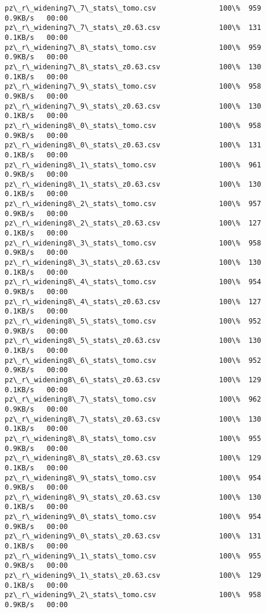 \documentclass[11pt]{article}
\begin{document}
\begin{Verbatim}[commandchars=\\\{\}]
pz\_r\_widening7\_7\_stats\_tomo.csv               100\%  959     0.9KB/s   00:00    
pz\_r\_widening7\_7\_stats\_z0.63.csv              100\%  131     0.1KB/s   00:00    
pz\_r\_widening7\_8\_stats\_tomo.csv               100\%  959     0.9KB/s   00:00    
pz\_r\_widening7\_8\_stats\_z0.63.csv              100\%  130     0.1KB/s   00:00    
pz\_r\_widening7\_9\_stats\_tomo.csv               100\%  958     0.9KB/s   00:00    
pz\_r\_widening7\_9\_stats\_z0.63.csv              100\%  130     0.1KB/s   00:00    
pz\_r\_widening8\_0\_stats\_tomo.csv               100\%  958     0.9KB/s   00:00    
pz\_r\_widening8\_0\_stats\_z0.63.csv              100\%  131     0.1KB/s   00:00    
pz\_r\_widening8\_1\_stats\_tomo.csv               100\%  961     0.9KB/s   00:00    
pz\_r\_widening8\_1\_stats\_z0.63.csv              100\%  130     0.1KB/s   00:00    
pz\_r\_widening8\_2\_stats\_tomo.csv               100\%  957     0.9KB/s   00:00    
pz\_r\_widening8\_2\_stats\_z0.63.csv              100\%  127     0.1KB/s   00:00    
pz\_r\_widening8\_3\_stats\_tomo.csv               100\%  958     0.9KB/s   00:00    
pz\_r\_widening8\_3\_stats\_z0.63.csv              100\%  130     0.1KB/s   00:00    
pz\_r\_widening8\_4\_stats\_tomo.csv               100\%  954     0.9KB/s   00:00    
pz\_r\_widening8\_4\_stats\_z0.63.csv              100\%  127     0.1KB/s   00:00    
pz\_r\_widening8\_5\_stats\_tomo.csv               100\%  952     0.9KB/s   00:00    
pz\_r\_widening8\_5\_stats\_z0.63.csv              100\%  130     0.1KB/s   00:00    
pz\_r\_widening8\_6\_stats\_tomo.csv               100\%  952     0.9KB/s   00:00    
pz\_r\_widening8\_6\_stats\_z0.63.csv              100\%  129     0.1KB/s   00:00    
pz\_r\_widening8\_7\_stats\_tomo.csv               100\%  962     0.9KB/s   00:00    
pz\_r\_widening8\_7\_stats\_z0.63.csv              100\%  130     0.1KB/s   00:00    
pz\_r\_widening8\_8\_stats\_tomo.csv               100\%  955     0.9KB/s   00:00    
pz\_r\_widening8\_8\_stats\_z0.63.csv              100\%  129     0.1KB/s   00:00    
pz\_r\_widening8\_9\_stats\_tomo.csv               100\%  954     0.9KB/s   00:00    
pz\_r\_widening8\_9\_stats\_z0.63.csv              100\%  130     0.1KB/s   00:00    
pz\_r\_widening9\_0\_stats\_tomo.csv               100\%  954     0.9KB/s   00:00    
pz\_r\_widening9\_0\_stats\_z0.63.csv              100\%  131     0.1KB/s   00:00    
pz\_r\_widening9\_1\_stats\_tomo.csv               100\%  955     0.9KB/s   00:00    
pz\_r\_widening9\_1\_stats\_z0.63.csv              100\%  129     0.1KB/s   00:00    
pz\_r\_widening9\_2\_stats\_tomo.csv               100\%  958     0.9KB/s   00:00    

\end{Verbatim}
\end{document}
